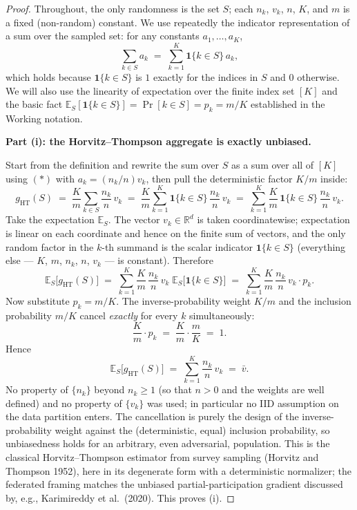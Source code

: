 \documentclass[11pt]{article}
\theoremstyle{definition}
\theoremstyle{remark}
\begin{document}
\begin{proof}
Throughout, the only randomness is the set $S$; each $n_k$, $v_k$, $n$, $K$, and $m$ is a fixed (non-random) constant. We use repeatedly the indicator representation of a sum over the sampled set: for any constants $a_1,\dots,a_K$,
\begin{equation}
\sum_{k\in S}a_k \;=\; \sum_{k=1}^{K}\mathbf 1\{k\in S\}\,a_k ,
\tag{$\ast$}
\end{equation}
which holds because $\mathbf 1\{k\in S\}$ is $1$ exactly for the indices in $S$ and $0$ otherwise. We will also use the linearity of expectation over the finite index set $[K]$ and the basic fact $\mathbb{E}_S[\mathbf 1\{k\in S\}]=\Pr[k\in S]=p_k=m/K$ established in the Working notation.

\medskip
\noindent\textbf{Part (i): the Horvitz--Thompson aggregate is exactly unbiased.}

Start from the definition and rewrite the sum over $S$ as a sum over all of $[K]$ using $(\ast)$ with $a_k=(n_k/n)v_k$, then pull the deterministic factor $K/m$ inside:
\[
g_{\mathrm{HT}}(S)
\;=\;\frac{K}{m}\sum_{k\in S}\frac{n_k}{n}\,v_k
\;=\;\frac{K}{m}\sum_{k=1}^{K}\mathbf 1\{k\in S\}\,\frac{n_k}{n}\,v_k
\;=\;\sum_{k=1}^{K}\frac{K}{m}\,\mathbf 1\{k\in S\}\,\frac{n_k}{n}\,v_k .
\]
Take the expectation $\mathbb{E}_S$. The vector $v_k\in\mathbb{R}^d$ is taken coordinatewise; expectation is linear on each coordinate and hence on the finite sum of vectors, and the only random factor in the $k$-th summand is the scalar indicator $\mathbf 1\{k\in S\}$ (everything else --- $K$, $m$, $n_k$, $n$, $v_k$ --- is constant). Therefore
\[
\mathbb{E}_S\big[g_{\mathrm{HT}}(S)\big]
\;=\;\sum_{k=1}^{K}\frac{K}{m}\,\frac{n_k}{n}\,v_k\;\mathbb{E}_S\big[\mathbf 1\{k\in S\}\big]
\;=\;\sum_{k=1}^{K}\frac{K}{m}\,\frac{n_k}{n}\,v_k\cdot p_k .
\]
Now substitute $p_k=m/K$. The inverse-probability weight $K/m$ and the inclusion probability $m/K$ cancel \emph{exactly} for every $k$ simultaneously:
\[
\frac{K}{m}\cdot p_k \;=\; \frac{K}{m}\cdot\frac{m}{K}\;=\;1 .
\]
Hence
\[
\mathbb{E}_S\big[g_{\mathrm{HT}}(S)\big]
\;=\;\sum_{k=1}^{K}\frac{n_k}{n}\,v_k
\;=\;\bar v .
\]
No property of $\{n_k\}$ beyond $n_k\ge 1$ (so that $n>0$ and the weights are well defined) and no property of $\{v_k\}$ was used; in particular no IID assumption on the data partition enters. The cancellation is purely the design of the inverse-probability weight against the (deterministic, equal) inclusion probability, so unbiasedness holds for an arbitrary, even adversarial, population. This is the classical Horvitz--Thompson estimator from survey sampling (Horvitz and Thompson 1952), here in its degenerate form with a deterministic normalizer; the federated framing matches the unbiased partial-participation gradient discussed by, e.g., Karimireddy et al.\ (2020). This proves (i).


\end{proof}
\end{document}
